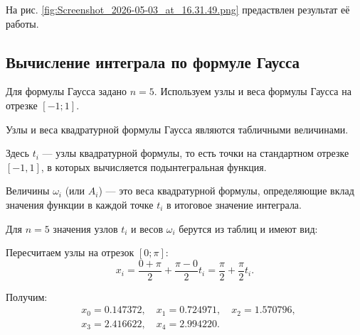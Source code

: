 На рис. \ref{fig:Screenshot_2026-05-03_at_16.31.49.png} предаствлен результат её работы.


\subsection{Вычисление интеграла по формуле Гаусса}

Для формулы Гаусса задано $n=5$. Используем узлы и веса формулы Гаусса на отрезке $[-1;1]$.

Узлы и веса квадратурной формулы Гаусса являются табличными величинами.

Здесь $t_i$ — узлы квадратурной формулы, то есть точки на стандартном отрезке $[-1,1]$, в которых вычисляется подынтегральная функция.

Величины $\omega_i$ (или $A_i$) — это веса квадратурной формулы, определяющие вклад значения функции в каждой точке $t_i$ в итоговое значение интеграла.

Для $n=5$ значения узлов $t_i$ и весов $\omega_i$ берутся из таблиц и имеют вид:

\begin{table}[H]
    \centering
    \caption{Узлы и веса формулы Гаусса при $n=5$}
    \label{table:gauss_nodes}
\end{table}

Пересчитаем узлы на отрезок $[0;\pi]$:
\[
x_i=\frac{0+\pi}{2}+\frac{\pi-0}{2}t_i=\frac{\pi}{2}+\frac{\pi}{2}t_i.
\]

Получим:
\[
\begin{aligned}
&x_0=0.147372, \quad x_1=0.724971, \quad x_2=1.570796,\\
&x_3=2.416622, \quad x_4=2.994220.
\end{aligned}
\]

